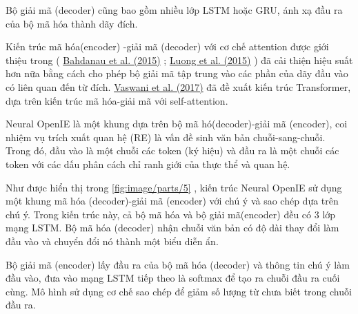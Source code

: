 \begin{singlespace}
    Bộ giải mã (decoder) cũng bao gồm nhiều lớp LSTM hoặc GRU, ánh xạ đầu ra của bộ mã hóa thành
    dãy đích.
\end{singlespace}

\begin{singlespace}
    Kiến trúc mã hóa(encoder) -giải mã (decoder) với cơ chế attention được giới thiệu trong (
    \href{http://arxiv.org/abs/1409.0473}{Bahdanau et al. (2015)}
    ;
    \href{https://aclanthology.org/D15-1166}{Luong et al. (2015)}
    ) đã cải thiện hiệu suất hơn nữa bằng cách cho phép bộ giải mã tập trung vào các phần của dãy đầu vào có liên quan đến từ đích.
    \href{https://scholar.google.com/scholar_lookup?title=Attention%20is%20all%20you%20need&publication_year=2017&author=A.%20Vaswani&author=N.%20Shazeer&author=N.%20Parmar&author=J.%20Uszkoreit&author=L.%20Jones&author=A.N.%20Gomez&author=L.%20Kaiser&author=I.%20Polosukhin}{Vaswani et al. (2017)} đã đề xuất kiến trúc Transformer, dựa trên kiến trúc mã hóa-giải mã với self-attention.
\end{singlespace}



\begin{singlespace}
Neural OpenIE là một khung dựa trên bộ mã hó(decoder)-giải mã (encoder), coi nhiệm vụ trích xuất quan hệ (RE) là vấn đề sinh văn bản chuỗi-sang-chuỗi.
Trong đó, đầu vào là một chuỗi các token (ký hiệu) và đầu ra là một chuỗi các token với các dấu phân cách chỉ ranh giới của thực thể
và quan hệ.
\end{singlespace}
\begin{singlespace}
Như được hiển thị trong
\renewcommand{\figurename}{Hình.}
\autoref{fig:image/parts/5}
, kiến trúc Neural OpenIE sử dụng một khung mã hóa (decoder)-giải mã (encoder) với chú ý và sao chép dựa trên chú ý.
Trong kiến trúc này, cả bộ mã hóa và bộ giải mã(encoder) đều có 3 lớp mạng LSTM. Bộ mã hóa (decoder) nhận chuỗi văn bản có độ dài thay đổi làm
đầu vào và chuyển đổi nó thành một biểu diễn ẩn.
\end{singlespace}
\begin{singlespace}
Bộ giải mã (encoder) lấy đầu ra của bộ mã hóa (decoder) và thông tin chú ý làm đầu vào, đưa vào
mạng LSTM tiếp theo là softmax để tạo ra chuỗi đầu ra cuối cùng. Mô hình sử dụng cơ chế sao chép để giảm số lượng từ chưa biết
trong chuỗi đầu ra.
\end{singlespace}

